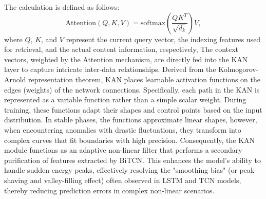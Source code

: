 \documentclass[conference]{{IEEEtran}}
\begin{document}
The calculation is defined as follows:\begin{equation}
        \text{Attention}(Q, K, V) = \text{softmax}\left(\frac{Q K^T}{\sqrt{d_k}}\right) V,
        \label{eq:attention}
    \end{equation}
where $Q$, $K$, and $V$ represent the current query vector, the indexing features used for retrieval, and the actual content information, respectively,  The context vectors, weighted by the Attention mechanism, are directly fed into the KAN layer to capture intricate inter-data relationships. Derived from the Kolmogorov-Arnold representation theorem, KAN places learnable activation functions on the edges (weights) of the network connections. Specifically, each path in the KAN is represented as a variable function rather than a simple scalar weight. During training, these functions adapt their shapes and control points based on the input distribution. In stable phases, the functions approximate linear shapes\cite{rhif2023veg}, however, when encountering anomalies with drastic fluctuations, they transform into complex curves that fit boundaries with high precision. Consequently, the KAN module functions as an adaptive non-linear filter that performs a secondary purification of features extracted by BiTCN. This enhances the model's ability to handle sudden energy peaks, effectively resolving the "smoothing bias" (or peak-shaving and valley-filling effect) often observed in LSTM and TCN models, thereby reducing prediction errors in complex non-linear scenarios.
\end{document}
